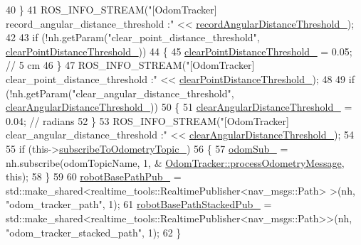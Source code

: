 \begin{DoxyCode}
40     \}
41     ROS\_INFO\_STREAM(\textcolor{stringliteral}{"[OdomTracker] record\_angular\_distance\_threshold :"} << 
      \hyperlink{classcl__move__base__z_1_1odom__tracker_1_1OdomTracker_a1274fe5334c109cd9c2339beb9411441}{recordAngularDistanceThreshold\_});
42 
43     \textcolor{keywordflow}{if} (!nh.getParam(\textcolor{stringliteral}{"clear\_point\_distance\_threshold"}, 
      \hyperlink{classcl__move__base__z_1_1odom__tracker_1_1OdomTracker_a7155d25d0e8dd9f237a79ff503b80e26}{clearPointDistanceThreshold\_}))
44     \{
45         \hyperlink{classcl__move__base__z_1_1odom__tracker_1_1OdomTracker_a7155d25d0e8dd9f237a79ff503b80e26}{clearPointDistanceThreshold\_} = 0.05; \textcolor{comment}{// 5 cm}
46     \}
47     ROS\_INFO\_STREAM(\textcolor{stringliteral}{"[OdomTracker] clear\_point\_distance\_threshold :"} << 
      \hyperlink{classcl__move__base__z_1_1odom__tracker_1_1OdomTracker_a7155d25d0e8dd9f237a79ff503b80e26}{clearPointDistanceThreshold\_});
48 
49     \textcolor{keywordflow}{if} (!nh.getParam(\textcolor{stringliteral}{"clear\_angular\_distance\_threshold"}, 
      \hyperlink{classcl__move__base__z_1_1odom__tracker_1_1OdomTracker_a1b79dd86745adfb31db822e0c8106282}{clearAngularDistanceThreshold\_}))
50     \{
51         \hyperlink{classcl__move__base__z_1_1odom__tracker_1_1OdomTracker_a1b79dd86745adfb31db822e0c8106282}{clearAngularDistanceThreshold\_} = 0.04; \textcolor{comment}{// radians}
52     \}
53     ROS\_INFO\_STREAM(\textcolor{stringliteral}{"[OdomTracker] clear\_angular\_distance\_threshold :"} << 
      \hyperlink{classcl__move__base__z_1_1odom__tracker_1_1OdomTracker_a1b79dd86745adfb31db822e0c8106282}{clearAngularDistanceThreshold\_});
54 
55     \textcolor{keywordflow}{if} (this->\hyperlink{classcl__move__base__z_1_1odom__tracker_1_1OdomTracker_afbe614b53a1493eb8268b8ea65b5b93a}{subscribeToOdometryTopic\_})
56     \{
57         \hyperlink{classcl__move__base__z_1_1odom__tracker_1_1OdomTracker_ab55df0e91246e43dff80912dc35a4fee}{odomSub\_} = nh.subscribe(odomTopicName, 1, &
      \hyperlink{classcl__move__base__z_1_1odom__tracker_1_1OdomTracker_a12c5a839cfde2e8f2f55a5e0c9647b18}{OdomTracker::processOdometryMessage}, \textcolor{keyword}{this});
58     \}
59 
60     \hyperlink{classcl__move__base__z_1_1odom__tracker_1_1OdomTracker_a40a7cbb6bb6595e250e7c685c781613b}{robotBasePathPub\_} = std::make\_shared<realtime\_tools::RealtimePublisher<nav\_msgs::Path>
      >(nh, \textcolor{stringliteral}{"odom\_tracker\_path"}, 1);
61     \hyperlink{classcl__move__base__z_1_1odom__tracker_1_1OdomTracker_a7a2fb23e835ba7d63e69c8db819be876}{robotBasePathStackedPub\_} = 
      std::make\_shared<realtime\_tools::RealtimePublisher<nav\_msgs::Path>>(nh, \textcolor{stringliteral}{"odom\_tracker\_stacked\_path"}, 1);
62 \}
\end{DoxyCode}
